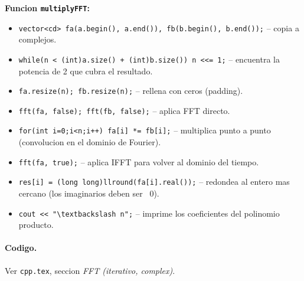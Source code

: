 \textbf{Funcion \texttt{multiplyFFT}:}
\begin{itemize}\setlength\itemsep{0pt}
	\item \verb|vector<cd> fa(a.begin(), a.end()), fb(b.begin(), b.end());| -- copia a complejos.
	\item \verb|while(n < (int)a.size() + (int)b.size()) n <<= 1;| -- encuentra la potencia de 2 que cubra el resultado.
	\item \verb|fa.resize(n); fb.resize(n);| -- rellena con ceros (padding).
	\item \verb|fft(fa, false); fft(fb, false);| -- aplica FFT directo.
	\item \verb|for(int i=0;i<n;i++) fa[i] *= fb[i];| -- multiplica punto a punto (convolucion en el dominio de Fourier).
	\item \verb|fft(fa, true);| -- aplica IFFT para volver al dominio del tiempo.
	\item \verb|res[i] = (long long)llround(fa[i].real());| -- redondea al entero mas cercano (los imaginarios deben ser ~0).
	\item \verb|cout << "\textbackslash n";| -- imprime los coeficientes del polinomio producto.
\end{itemize}

\paragraph{Codigo.}
Ver \texttt{cpp.tex}, seccion \textit{FFT (iterativo, complex)}.

\vspace{0.5em|||}
